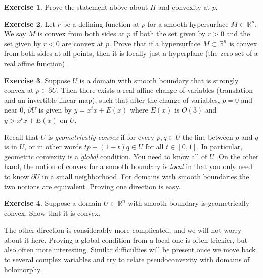 \documentclass[12pt,openany]{book}
\newcommand{\R}{{\mathbb{R}}}
\newcommand{\myindex}[1]{#1\index{#1}}
\theoremstyle{plain}
\theoremstyle{remark}
\theoremstyle{definition}
\newenvironment{exbox}{%
    \def\FrameCommand{\vrule width 1pt \relax\hspace{10pt}}%
    \MakeFramed{\advance\hsize-\width\FrameRestore}%
}{%
    \endMakeFramed
}
\theoremstyle{exercise}
\newtheorem{exercise}{Exercise}[section]
\theoremstyle{example}
\begin{document}
\begin{exbox}
\begin{exercise}
Prove the statement above about $H$ and convexity at $p$.
\end{exercise}

\begin{exercise}
Let $r$ be a defining function at $p$ for a smooth hypersurface
$M \subset \R^n$.
We say $M$ is convex from both sides at $p$ if both the set given by
$r > 0$ and the set given by $r < 0$ are convex at $p$.
Prove that if a hypersurface $M \subset \R^n$ is convex from both sides at all
points, then it is locally just a hyperplane (the zero set of a real affine
function).
\end{exercise}

\begin{exercise}
Suppose $U$ is a domain with smooth boundary that is strongly convex
at $p \in \partial U$.
Then there exists a real affine change of variables (translation and an
invertible linear map), such that after the change of variables, $p=0$ and near $0$, $\partial U$ is given by
$y = x^t x + E(x)$ where $E(x)$ is $O(3)$ and
$y > x^tx + E(x)$ on $U$.
\end{exercise}
\end{exbox}

Recall that $U$ is
\emph{\myindex{geometrically convex}}
if for every $p,q \in U$ the
line between $p$ and $q$ is in $U$, or in other words
$tp +(1-t)q \in U$ for all $t \in [0,1]$.
In particular, geometric convexity is a \emph{global} condition.  You need
to know all of $U$.  On the other hand, the notion of convex for a smooth boundary is
\emph{local} in that you only need to know $\partial U$ in a small
neighborhood.  For domains with
smooth boundaries the two notions are equivalent.  Proving
one direction is easy.

\begin{exbox}
\begin{exercise}
Suppose a domain $U \subset \R^n$ with smooth
boundary is geometrically
convex.  Show that it is convex.
\end{exercise}
\end{exbox}

The other direction is considerably more complicated, and we will not worry
about it here.  Proving a global condition from a local one is often
trickier, but also often more interesting.
Similar difficulties will be present once we move back to
several complex variables and try to relate pseudoconvexity with domains of
holomorphy.
\end{document}
